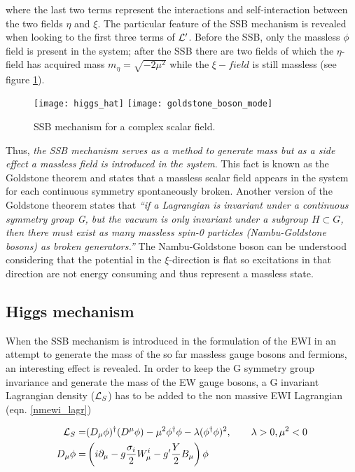 \noindent where the last two terms represent the interactions and self-interaction between the two fields $\eta$ and $\xi$. The particular feature of the SSB mechanism is revealed when looking to the first three  terms of $\mathcal{L}'$. Before the SSB, only the massless $\phi$ field is present in the system; after the SSB there are two fields of which the $\eta$-field has acquired mass $m_\eta=\sqrt{-2\mu^2}$ while the $\xi-field$ is still massless (see figure \ref{higgs_hat}).\\  

\begin{figure}[!h]
\centering
\texttt{[image: higgs\_hat]}
\texttt{[image: goldstone\_boson\_mode]}
\caption[SSB mechanism for complex scalar field]{SSB mechanism for a complex scalar field\cite{broken_symmetry,endres}.}
\label{higgs_hat}
\end{figure}

\noindent Thus, \textit {the SSB mechanism serves as a method to generate mass but as a side effect a massless field is introduced in the system}. This fact is known as the Goldstone theorem and states that a massless scalar field appears in the system for each continuous symmetry spontaneously broken. Another version of the Goldstone theorem states that \textit{``if a Lagrangian is invariant under a continuous symmetry group G, but the vacuum is only invariant under a subgroup $H\subset G$, then there must exist as many massless spin-0 particles (Nambu-Goldstone bosons) as broken generators.''}\cite{pich} The Nambu-Goldstone boson can be understood considering that the potential in the $\xi$-direction is flat so excitations in that direction are not energy consuming and thus represent a massless state.                   

\subsection{Higgs mechanism}

\noindent When the SSB mechanism is introduced in the formulation of the EWI in an attempt to generate the mass of the so far massless gauge bosons and fermions, an interesting effect is revealed. In order to keep the G symmetry group invariance and generate the mass of the EW gauge bosons, a G invariant Lagrangian density ($\mathcal{L}_S$) has to be added to the non massive EWI Lagrangian (eqn. \ref{nmewi_lagr})

\begin{align}
\mathcal{L}_S    = &(D_\mu\phi)^\dagger(D^\mu\phi) - \mu^2\phi^\dagger\phi - \lambda(\phi^\dagger\phi)^2 , \qquad \lambda>0, \mu^2<0 \label{ls}\\
D_\mu\phi = &\left(i\partial_\mu - g\frac{\sigma_i}{2}W^i_\mu -
g'\frac{Y}{2}B_\mu\right)\phi
\end{align}

